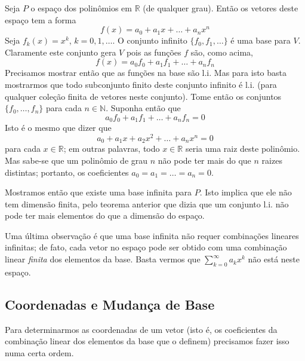 \begin{exemplo*}
  Seja $P$ o espaço dos polinômios em ${\mathbb{R}}$ (de qualquer grau).  Então os vetores deste espaço tem a forma
  \begin{equation*}
     f(x) = a_0+a_1x+\ldots +a_nx^n
  \end{equation*}
  Seja $f_k(x) = x^k$, $k=0,1,\ldots$. O conjunto infinito $\{f_0, f_1,\ldots\}$ é uma base para $V$. Claramente este conjunto gera $V$ pois as funções $f$ são, como acima,
  \begin{equation*}
     f(x) = a_0f_0+a_1f_1+\ldots+a_nf_n
  \end{equation*}
  Precisamos mostrar então que as funções na base são l.i. Mas para isto basta mostrarmos que todo subconjunto finito deste conjunto infinito é l.i. (para qualquer coleção finita de vetores neste conjunto). Tome então os conjuntos $\{f_0,\ldots,f_n\}$ para cada $n\in {\mathbb{N}}$. Suponha então que
  \begin{equation*}
     a_0f_0+a_1f_1+\ldots +a_nf_n = 0
  \end{equation*}
  Isto é o mesmo que dizer que
  \begin{equation*}
     a_0+a_1x+a_2x^2+\ldots+a_nx^n = 0
  \end{equation*}
  para cada $x\in {\mathbb{R}}$; em outras palavras, todo $x\in {\mathbb{R}}$ seria uma raiz deste polinômio. Mas sabe-se que um polinômio de grau $n$ não pode ter mais do que $n$ raizes distintas; portanto, os coeficientes $a_0=a_1=\ldots=a_n=0$.
  
  Mostramos então que existe uma base infinita para $P$. Isto implica que ele não tem dimensão finita, pelo teorema anterior que dizia que um conjunto l.i. não pode ter mais elementos do que a dimensão do espaço. 
  
  Uma última observação é que uma base infinita não requer combinações lineares infinitas; de fato, cada vetor no espaço pode ser obtido com uma combinação linear \emph{finita} dos elementos da base. Basta vermos que $\sum_{k=0}^{\infty} a_kx^k$ não está neste espaço.
\end{exemplo*}

\subsection{Coordenadas e Mudança de Base}

Para determinarmos as coordenadas de um vetor (isto é, os coeficientes da combinação linear dos elementos da base que o definem) precisamos fazer isso numa certa ordem.

